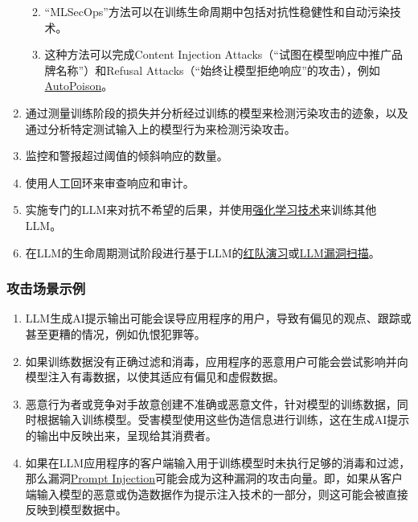 \documentclass[
]{article}
\providecommand{\tightlist}{%
  \setlength{\itemsep}{0pt}\setlength{\parskip}{0pt}}
\begin{document}
\begin{enumerate}
  \begin{enumerate}
  \def\labelenumii{\arabic{enumii}.}
  \tightlist
  \item
    ``MLSecOps''方法可以在训练生命周期中包括对抗性稳健性和自动污染技术。
  \item
    这种方法可以完成Content Injection
    Attacks（``试图在模型响应中推广品牌名称''）和Refusal
    Attacks（``始终让模型拒绝响应''的攻击），例如\href{https://github.com/azshue/AutoPoison}{AutoPoison}。
  \end{enumerate}
\item
  通过测量训练阶段的损失并分析经过训练的模型来检测污染攻击的迹象，以及通过分析特定测试输入上的模型行为来检测污染攻击。
\item
  监控和警报超过阈值的倾斜响应的数量。
\item
  使用人工回环来审查响应和审计。
\item
  实施专门的LLM来对抗不希望的后果，并使用\href{https://wandb.ai/ayush-thakur/Intro-RLAIF/reports/An-Introduction-to-Training-LLMs-Using-Reinforcement-Learning-From-Human-Feedback-RLHF---VmlldzozMzYyNjcy}{强化学习技术}来训练其他LLM。
\item
  在LLM的生命周期测试阶段进行基于LLM的\href{https://www.anthropic.com/index/red-teaming-language-models-to-reduce-harms-methods-scaling-behaviors-and-lessons-learned}{红队演习}或\href{https://github.com/leondz/garak}{LLM漏洞扫描}。
\end{enumerate}

\subsubsection{攻击场景示例}\label{ux653bux51fbux573aux666fux793aux4f8b}

\begin{enumerate}
\def\labelenumi{\arabic{enumi}.}
\tightlist
\item
  LLM生成AI提示输出可能会误导应用程序的用户，导致有偏见的观点、跟踪或甚至更糟的情况，例如仇恨犯罪等。
\item
  如果训练数据没有正确过滤和消毒，应用程序的恶意用户可能会尝试影响并向模型注入有毒数据，以使其适应有偏见和虚假数据。
\item
  恶意行为者或竞争对手故意创建不准确或恶意文件，针对模型的训练数据，同时根据输入训练模型。受害模型使用这些伪造信息进行训练，这在生成AI提示的输出中反映出来，呈现给其消费者。
\item
  如果在LLM应用程序的客户端输入用于训练模型时未执行足够的消毒和过滤，那么漏洞\href{https://github.com/OWASP/www-project-top-10-for-large-language-model-applications/blob/main/1_0_vulns/PromptInjection.md}{Prompt
  Injection}可能会成为这种漏洞的攻击向量。即，如果从客户端输入模型的恶意或伪造数据作为提示注入技术的一部分，则这可能会被直接反映到模型数据中。
\end{enumerate}
\end{document}
